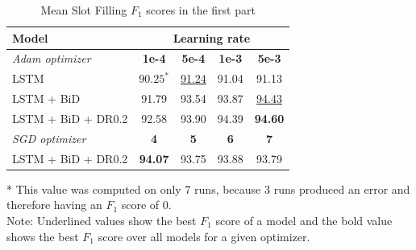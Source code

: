 \documentclass[a4paper]{article}
\begin{document}
\begin{table}
  \caption{Mean Slot Filling $F_1$ scores in the first part}
  \label{tab:slot_filling_part1}
  \begin{tabular}{l|c c c c}
    \toprule
    \textbf{Model} & \multicolumn{4}{c}{\textbf{Learning rate} } \\
    \midrule
    \textit{Adam optimizer} & \textbf{1e-4} & \textbf{5e-4} & \textbf{1e-3} & \textbf{5e-3} \\
    \midrule
    LSTM & ${90.25}^*$ & \underline{91.24} & 91.04 & 91.13 \\
    LSTM + BiD & 91.79 & 93.54 & 93.87 & \underline{94.43}\\
    LSTM + BiD + DR0.2 & 92.58 & 93.90 & 94.39 & \textbf{94.60} \\
    \toprule
    \textit{SGD optimizer} & \textbf{4}	& \textbf{5} & \textbf{6} & \textbf{7} \\
    \midrule
    LSTM + BiD + DR0.2 & \textbf{94.07} & 93.75 & 93.88 & 93.79 \\  
    \bottomrule
  \end{tabular}
  \begin{minipage}{7.5cm}
    \vspace{0.1cm}
    * This value was computed on only 7 runs, because 3 runs produced an error and therefore having an $F_1$ score of 0.\\
    Note: Underlined values show the best $F_1$ score of a model and the bold value shows the best $F_1$ score over all models for a given optimizer.
  \end{minipage}
\end{table}
\end{document}
